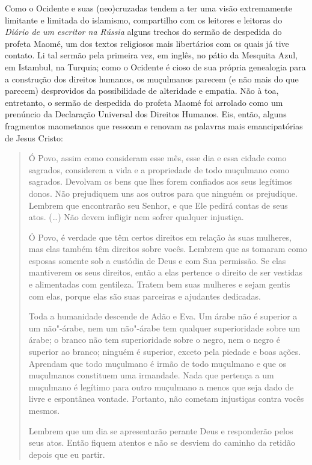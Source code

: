 Como o Ocidente e suas (neo)cruzadas tendem a ter uma visão extremamente
limitante e limitada do islamismo, compartilho com os leitores e
leitoras do \emph{Diário de um escritor na Rússia} alguns trechos do
sermão de despedida do profeta Maomé, um dos textos religiosos mais
libertários com os quais já tive contato. Li tal sermão pela primeira
vez, em inglês, no pátio da Mesquita Azul, em Istambul, na Turquia; como
o Ocidente é cioso de sua própria genealogia para a construção dos
direitos humanos, os muçulmanos parecem (e não mais do que parecem)
desprovidos da possibilidade de alteridade e empatia. Não à toa,
entretanto, o sermão de despedida do profeta Maomé foi arrolado como um
prenúncio da Declaração Universal dos Direitos Humanos. Eis, então,
alguns fragmentos maometanos que ressoam e renovam as palavras mais
emancipatórias de Jesus Cristo:

\begin{quote}
Ó Povo, assim como consideram esse mês, esse dia e essa cidade como
sagrados, considerem a vida e a propriedade de todo muçulmano como
sagrados. Devolvam os bens que lhes forem confiados aos seus legítimos
donos. Não prejudiquem uns aos outros para que ninguém os prejudique.
Lembrem que encontrarão seu Senhor, e que Ele pedirá contas de seus
atos. (\ldots{}) Não devem infligir nem sofrer qualquer injustiça.

Ó Povo, é verdade que têm certos direitos em relação às suas mulheres,
mas elas também têm direitos sobre vocês. Lembrem que as tomaram como
esposas somente sob a custódia de Deus e com Sua permissão. Se elas
mantiverem os seus direitos, então a elas pertence o direito de ser
vestidas e alimentadas com gentileza. Tratem bem suas mulheres e sejam
gentis com elas, porque elas são suas parceiras e ajudantes dedicadas.

Toda a humanidade descende de Adão e Eva. Um árabe não é superior a um
não"-árabe, nem um não"-árabe tem qualquer superioridade sobre um árabe; o
branco não tem superioridade sobre o negro, nem o negro é superior ao
branco; ninguém é superior, exceto pela piedade e boas ações. Aprendam
que todo muçulmano é irmão de todo muçulmano e que os muçulmanos
constituem uma irmandade. Nada que pertença a um muçulmano é legítimo
para outro muçulmano a menos que seja dado de livre e espontânea
vontade. Portanto, não cometam injustiças contra vocês mesmos.

Lembrem que um dia se apresentarão perante Deus e responderão pelos seus
atos. Então fiquem atentos e não se desviem do caminho da retidão depois
que eu partir.
\end{quote}

